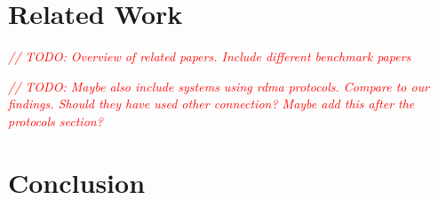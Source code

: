 \documentclass{article}
\newcommand{\todo}[1]{\textit{\textcolor{red}{// TODO: #1} }}
\theoremstyle{plain}
\theoremstyle{definition}
\theoremstyle{remark}
\begin{document}
\iffalse
\fi
\newcommand{\seqnode}[3][]{ 
  \node[#1] (#2) {#3};
  \node[below of=#2, node distance=5cm] (#2_g) {};
  \draw (#2) -- (#2_g);
}
\newcommand{\hseqnode}[3][]{ 
  \node[#1] (#2) {#3};
  \node[below of=#2, node distance=5cm] (#2_g) {};
}
\newcommand{\msg}[5][above]{
  \draw[->] ($(#2)!#4!(#2_g)$) -- node[#1,scale=0.75,midway]{#5} ($(#3)!#4+0.04!(#3_g)$);
}
\newcommand{\fetch}[4]{
  \draw[-] ($(#1)!#3-0.04!(#1_g)$) -- node[above,scale=0.75,midway]{#4} ($(#2)!#3!(#2_g)$);
  \draw[->] ($(#2)!#3!(#2_g)$) -- node[above,scale=0.75,midway]{} ($(#1)!#3+0.04!(#1_g)$);
}

\newcommand{\queue}[2][]{ 
  \draw (#2) -- ++(2cm,0) -- ++(0,-1cm) -- ++(-2cm,0);
  \foreach \i in {1,...,4} \draw (#2)++(2cm-\i*3mm,0) -- +(0,-1cm);
  \node[align=center, , xshift = 1cm, yshift = .15cm] at (#2) {#1};
}

\newcommand{\rqueue}[2][]{ 
  \draw (#2) -- ++(2cm,0);
  \draw (#2) -- ++(0,-1cm) -- ++(2cm,0);
  \foreach \i in {1,...,4} \draw (#2)++(\i*3mm,0) -- +(0,-1cm);
  \node[align=center, , xshift = 1cm, yshift = .15cm] at (#2) {#1};
}


\tableofcontents
\pagebreak


\pagebreak



\pagebreak
\section{Related Work}

\todo{Overview of related papers. Include different benchmark papers}

\todo{Maybe also include systems using rdma protocols. Compare to our findings. Should they have used other connection? 
Maybe add this after the protocols section?}

\pagebreak


\pagebreak


\pagebreak


\pagebreak


\pagebreak


\pagebreak


\pagebreak


\pagebreak



\pagebreak
\section{Conclusion}



\pagebreak


{}
\end{document}
